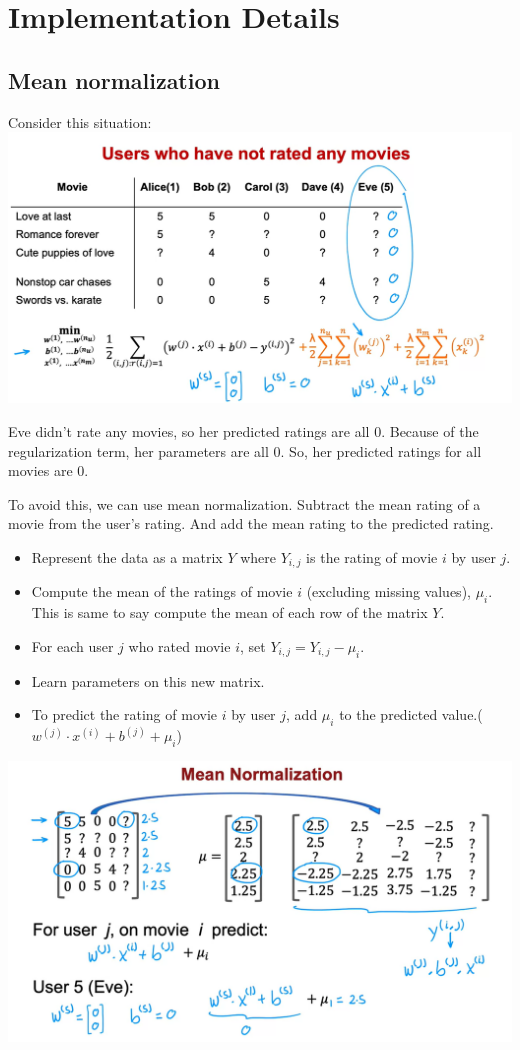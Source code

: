 \chapter{Implementation Details}
\section{Mean normalization}
Consider this situation:\\
\includegraphics*[width=\textwidth]{images/15.1}

Eve didn't rate any movies, so her predicted ratings are all 0. Because of the regularization term, 
her parameters are all 0. So, her predicted ratings for all movies are 0.

To avoid this, we can use mean normalization. Subtract the mean rating of a movie from the user's rating.
And add the mean rating to the predicted rating.

\begin{itemize}
    \item Represent the data as a matrix $Y$ where $Y_{i, j}$ is the rating of movie $i$ by user $j$.
    \item Compute the mean of the ratings of movie $i$ (excluding missing values), $\mu_i$. This is same to say 
    compute the mean of each row of the matrix $Y$.
    \item For each user $j$ who rated movie $i$, set $Y_{i, j} = Y_{i, j} - \mu_i$.
    \item Learn parameters on this new matrix.
    \item To predict the rating of movie $i$ by user $j$, add $\mu_i$ to the predicted value.($w^{(j)} \cdot x^{(i)} + b^{(j)} + \mu_i$)
\end{itemize}
\includegraphics*[width=\textwidth]{images/15.2}

